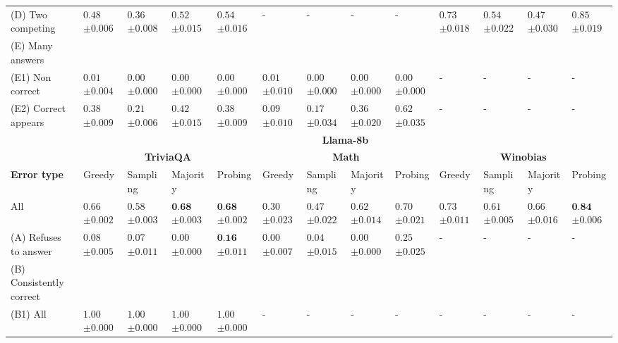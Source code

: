 \begin{table}[t]
{\begin{tabular}{l|llll|llll|llll}
         (D) Two competing & $0.48$ \tiny $\pm 0.006$ & $0.36$ \tiny $\pm 0.008$ & $0.52$ \tiny $\pm 0.015$ & $0.54$ \tiny $\pm 0.016$ & - & - & - & - & $0.73$ \tiny $\pm 0.018$ & $0.54$ \tiny $\pm 0.022$ & $0.47$ \tiny $\pm 0.030$ & $0.85$ \tiny $\pm 0.019$ \\
         (E) Many answers  \\
         \hspace{1em} (E1) Non correct & $0.01$ \tiny $\pm 0.004$ & $0.00$ \tiny $\pm 0.000$ & $0.00$ \tiny $\pm 0.000$ & $0.00$ \tiny $\pm 0.000$ & $0.01$ \tiny $\pm 0.010$ & $0.00$ \tiny $\pm 0.000$ & $0.00$ \tiny $\pm 0.000$ & $0.00$ \tiny $\pm 0.000$ & - & - & - & - \\
         \hspace{1em} (E2) Correct appears &  $0.38$ \tiny $\pm 0.009$ & $0.21$ \tiny $\pm 0.006$ & $0.42$ \tiny $\pm 0.015$ & $0.38$ \tiny $\pm 0.009$ & $0.09$ \tiny $\pm 0.010$ & $0.17$ \tiny $\pm 0.034$ & $0.36$ \tiny $\pm 0.020$ & $0.62$ \tiny $\pm 0.035$ & - & - & - & - \\
         \midrule
     & \multicolumn{12}{c}{\textbf{Llama-8b}} \\
    \cmidrule(lr){2-13}
             & \multicolumn{4}{c}{\textbf{TriviaQA}} & \multicolumn{4}{c}{\textbf{Math}} & \multicolumn{4}{c}{\textbf{Winobias}} \\
    \cmidrule(lr){2-5} \cmidrule(lr){6-9} \cmidrule(lr){10-13}
       \textbf{Error type}  & Greedy & Sampling & Majority & Probing & Greedy & Sampling & Majority & Probing & Greedy & Sampling & Majority & Probing \\
       \midrule
         All & $0.66$ \tiny $\pm 0.002$ & $0.58$ \tiny $\pm 0.003$ & $\textbf{0.68}$ \tiny $\pm 0.003$ & $\textbf{0.68}$ \tiny $\pm 0.002$ & $0.30$ \tiny $\pm 0.023$ & $0.47$ \tiny $\pm 0.022$ & $0.62$ \tiny $\pm 0.014$ & $0.70$ \tiny $\pm 0.021$ & $0.73$ \tiny $\pm 0.011$ & $0.61$ \tiny $\pm 0.005$ & $0.66$ \tiny $\pm 0.016$ & $\textbf{0.84}$ \tiny $\pm 0.006$ \\
         (A) Refuses to answer & $0.08$ \tiny $\pm 0.005$ & $0.07$ \tiny $\pm 0.011$ & $0.00$ \tiny $\pm 0.000$ & $\textbf{0.16}$ \tiny $\pm 0.011$ & $0.00$ \tiny $\pm 0.007$ & $0.04$ \tiny $\pm 0.015$ & $0.00$ \tiny $\pm 0.000$ & $0.25$ \tiny $\pm 0.025$ & - & - & - & - \\
         (B) Consistently correct \\
         \hspace{1em} (B1) All & $1.00$ \tiny $\pm 0.000$ & $1.00$ \tiny $\pm 0.000$ & $1.00$ \tiny $\pm 0.000$ & $1.00$ \tiny $\pm 0.000$ & - & - & - & - & - & - & - & - \\

\end{tabular}}
\end{table}
